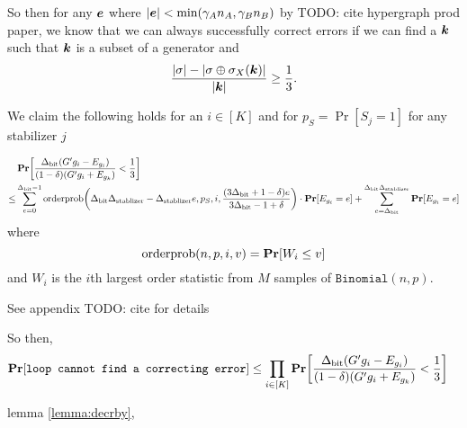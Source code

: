 So then for any $\boldsymbol{\boldsymbol{e}}$ where $|\boldsymbol{\boldsymbol{e}}| < \min(\gamma_An_A, \gamma_Bn_B)$ by TODO: cite hypergraph prod paper, we know that we can always successfully
correct errors if we can find a $\boldsymbol{\boldsymbol{k}}$ such that $\boldsymbol{\boldsymbol{k}}$ is a subset of a generator and
$$
	\frac{|\sigma| - |\sigma \oplus \sigma_X(\boldsymbol{\boldsymbol{k}})|}{|\boldsymbol{\boldsymbol{k}}|}	\geq \frac{1}{3}.
$$

\newcommand{\OptVarRV}{Q}
\newcommand{\OptVarEqChangeable}[1]{
\frac
			{\DegBit \mleft(#1{g_i} - \lyingGenerator_{g_i}\mright)}
			{(1 - \delta)(#1{g_i} + \lyingGenerator_{g_k})}
}
\newcommand{\OptVarEq}{\OptVarEqChangeable{\genscoreRVCorrected}}

\begin{lemma}{We claim the following holds for an $i \in [K]$ and for $p_S = \Pr[S_j = 1]$ for any stabilizer $j$}
	
\begin{align*}
	&\Pr\mleft[\OptVarEq < \frac{1}{3}\mright] \\
	\leq &\sum_{e = 0}^{\DegBit - 1} 
			\OrderP\mleft(\DegBit\DegStable - \DegStable e, p_S, i, \frac{(3\DegBit + 1 - \delta) e}{3\DegBit -1 + \delta}\mright) \cdot \Pr[E_{g_i} = e] 
			+ \sum_{e = \DegBit}^{\DegBit\DegStable}\Pr[E_{g_i} = e]
\end{align*}
where
$$
	\OrderP(n, p, i, v) = \Pr\mleft[W_i \leq v \mright]
$$
and $W_i$ is the $i$th largest order statistic from $M$ samples of $\texttt{Binomial}(n, p)$.

See appendix TODO: cite for details
\end{lemma}

So then, \begin{align*}
	\Pr\mleft[\texttt{loop cannot find a correcting error}\mright] &\leq
		\prod_{i \in [K]} \Pr\mleft[\OptVarEq < \frac{1}{3} \mright]
\end{align*}



 lemma \ref{lemma:decrby}, 


